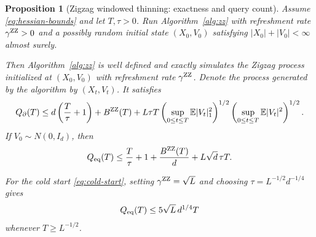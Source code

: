 \documentclass{amsart}
\theoremstyle{plain}
\newtheorem{prop}[theorem]{Proposition}
\theoremstyle{definition}
\theoremstyle{remark}
\newcommand{\EE}{\mathbb{E}}
\newcommand{\abs}[1]{\lvert#1\rvert}
\newcommand{\E}{\EE}
\newcommand{\1}{\mathbf 1}
\newcommand{\zz}{{\rm ZZ}}
\begin{document}
\begin{prop}[Zigzag windowed thinning: exactness and query count]
\label{prop:zz-thinning}
Assume \eqref{eq:hessian-bounds} and let $T,\tau>0$.
Run Algorithm~\ref{alg:zz} with refreshment rate $\gamma^{\zz}>0$ and a
possibly random initial state $(X_0,V_0)$ satisfying  $\abs{X_0}+\abs{V_0}<\infty$ almost surely.

Then Algorithm~\ref{alg:zz} is well defined and exactly simulates the Zigzag
process initialized at $(X_0,V_0)$ with refreshment rate $\gamma^{\zz}$.
Denote the process generated by the algorithm by $(X_t,V_t)$. It satisfies
\begin{equation}\label{eq:zz-thinning-general}
Q_\partial(T)
\le d\left(\frac{T}{\tau}+1\right)
+B^{\zz}(T)
+L\tau T
\left(\sup_{0\le t\le T}\E\abs{V_t}_1^2\right)^{1/2}
\left(\sup_{0\le t\le T}\E\abs{V_t}^2\right)^{1/2}.
\end{equation}
If $V_0\sim N(0,I_d)$, then
\begin{equation}\label{eq:zz-thinning-equivalent}
Q_{\rm eq}(T)
\le\frac{T}{\tau}+1+\frac{B^{\zz}(T)}{d}
+L\sqrt d\,\tau T.
\end{equation}

For the cold start \eqref{eq:cold-start}, setting
$\gamma^{\zz}=\sqrt L$ and choosing
$\tau=L^{-1/2}d^{-1/4}$ gives
\begin{equation}\label{eq:zz-thinning-cold}
Q_{\rm eq}(T)\le5\sqrt L\,d^{1/4}T
\end{equation}
whenever $T\ge L^{-1/2}$.
\end{prop}
\end{document}
